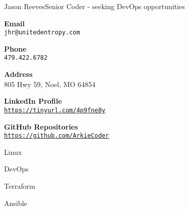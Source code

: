 \documentclass{article}
\begin{document}
\raggedbottom
\begin{cv}[avatar]{Jason Reeves}{Senior Coder - seeking DevOps opportunities}
\cvsidebar %



\begin{cvitem}[Envelope][4]
    \textbf{Email}\\
    \texttt{jhr@unitedentropy.com}
\end{cvitem}

\cvseparator[3]
\begin{cvitem}[Phone][4]
    \textbf{Phone}\\
    \texttt{479.422.6782}
\end{cvitem}

\cvseparator[3]
\begin{cvitem}[Home][4]
    \textbf{Address}\\
    805 Hwy 59, Noel, MO  64854
\end{cvitem}

\cvseparator[3]
\begin{cvitem}[Globe][4]
    \textbf{LinkedIn Profile}\\
    \href{https://tinyurl.com/4p9fne8y}{\underline{\texttt{https://tinyurl.com/4p9fne8y}}}
\end{cvitem}

\cvseparator[3]
\begin{cvitem}[Globe][4]
    \textbf{GitHub Repositories}\\
    \href{https://github.com/ArkieCoder}{\underline{\texttt{https://github.com/ArkieCoder}}}
\end{cvitem}


\begin{cvitem}
    Linux
\end{cvitem}

\cvseparator
\begin{cvitem}
    DevOps
\end{cvitem}

\cvseparator
\begin{cvitem}
    Terraform
\end{cvitem}

\cvseparator
\begin{cvitem}
    Ansible
\end{cvitem}


\end{cv}
\end{document}
